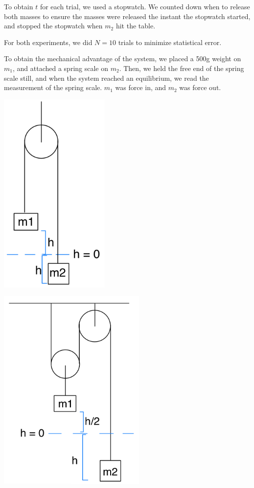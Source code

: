 \documentclass[12pt]{article}
\begin{document}
To obtain \(t\) for each trial, we used a stopwatch. We counted down when to release both masses to ensure the masses were released the instant the stopwatch started, and stopped the stopwatch when \(m_2\) hit the table.

For both experiments, we did \(N = 10\) trials to minimize statistical error.

To obtain the mechanical advantage of the system, we placed a 500g weight on \(m_1\), and attached a spring scale on \(m_2\). Then, we held the free end of the spring scale still, and when the system reached an equilibrium, we read the measurement of the spring scale. \(m_1\) was force in, and \(m_2\) was force out.

\begin{center}
\includegraphics[height=4in]{./singlepulley.png}
\end{center}

\begin{center}
\includegraphics[height=4in]{./doublepulley.png}
\end{center}
\end{document}
